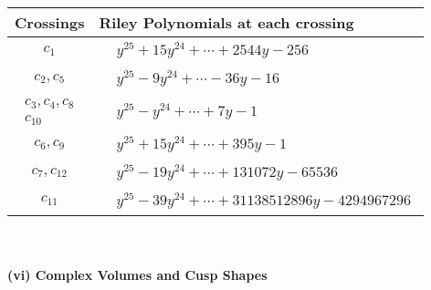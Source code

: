 \documentclass[1p]{elsarticle_modified}
\theoremstyle{definition}
\begin{document}
\begin{tabular}{m{50pt}|m{274pt}}
Crossings & \hspace{64pt}Riley Polynomials at each crossing \\
\hline $$\begin{aligned}c_{1}\end{aligned}$$&$\begin{aligned}
&y^{25}+15 y^{24}+\cdots+2544 y-256
\end{aligned}$\\
\hline $$\begin{aligned}c_{2},c_{5}\end{aligned}$$&$\begin{aligned}
&y^{25}-9 y^{24}+\cdots-36 y-16
\end{aligned}$\\
\hline $$\begin{aligned}c_{3},c_{4},c_{8}\\c_{10}\end{aligned}$$&$\begin{aligned}
&y^{25}- y^{24}+\cdots+7 y-1
\end{aligned}$\\
\hline $$\begin{aligned}c_{6},c_{9}\end{aligned}$$&$\begin{aligned}
&y^{25}+15 y^{24}+\cdots+395 y-1
\end{aligned}$\\
\hline $$\begin{aligned}c_{7},c_{12}\end{aligned}$$&$\begin{aligned}
&y^{25}-19 y^{24}+\cdots+131072 y-65536
\end{aligned}$\\
\hline $$\begin{aligned}c_{11}\end{aligned}$$&$\begin{aligned}
&y^{25}-39 y^{24}+\cdots+31138512896 y-4294967296
\end{aligned}$\\
\hline
\end{tabular}\\~\\
\newpage\flushleft \textbf{(vi) Complex Volumes and Cusp Shapes}
\end{document}
